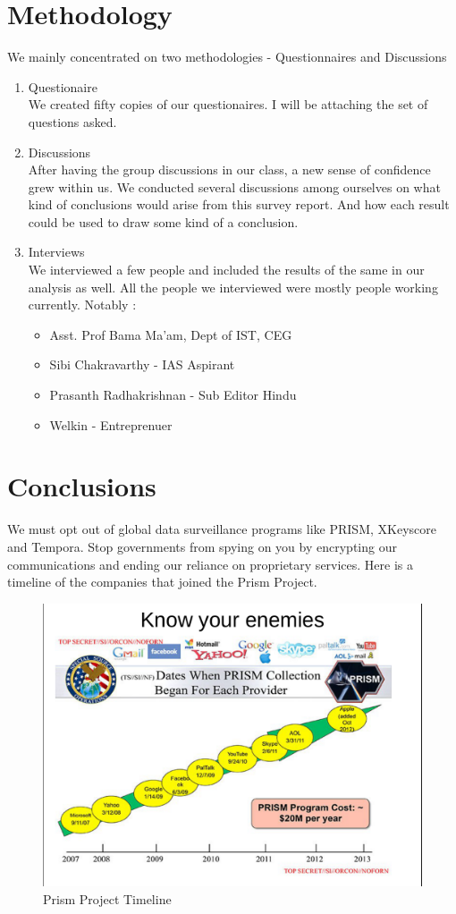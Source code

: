 \documentclass[11pt]{book}
\begin{document}
\chapter{Methodology}
We mainly concentrated on two methodologies - Questionnaires and Discussions
\begin{enumerate}
	\item Questionaire \\We created fifty copies of our questionaires. I will be attaching the set of questions asked. 
	\item Discussions \\After having the group discussions in our class, a new sense of confidence grew within us. 
		We conducted several discussions among ourselves on what kind of conclusions would arise from this survey report. 
		And how each result could be used to draw some kind of a conclusion. 
	\item Interviews \\We interviewed a few people and included the results of the same in our analysis as well. 
		All the people we interviewed were mostly people working currently. Notably : 
		\begin{itemize}
			\item Asst. Prof Bama Ma'am, Dept of IST, CEG
			\item Sibi Chakravarthy - IAS Aspirant
			\item Prasanth Radhakrishnan - Sub Editor Hindu
			\item Welkin - Entreprenuer
		\end{itemize}
\end {enumerate}
\chapter{Conclusions}
We must opt out of global data surveillance programs like PRISM, XKeyscore and Tempora. Stop governments from spying on you by encrypting our communications and ending our reliance on proprietary services.
Here is a timeline of the companies that joined the Prism Project.
\begin{figure}[ht!]
	\centering
	\includegraphics[width=150mm]{prism1.png}
	\caption{Prism Project Timeline}
	\label{overflow}
\end{figure}
\newpage
\end{document}
